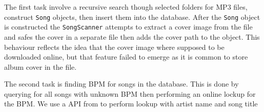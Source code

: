 The first task involve a recursive search though selected folders for MP3 files, construct \texttt{Song} objects, then insert them into the database. After the \texttt{Song} object is constructed the \texttt{SongScanner} attempts to extract a cover image from the file and safes the cover in a separate file then adds the cover path to the object. This behaviour reflects the idea that the cover image where supposed to be downloaded online, but that feature failed to emerge as it is common to store album cover in the file.

The second task is finding BPM for songs in the database. This is done by querying for all songs with unknown BPM then performing an online lockup for the BPM. We use a API from \citet{echonest:API} to perform lookup with artist name and song title




